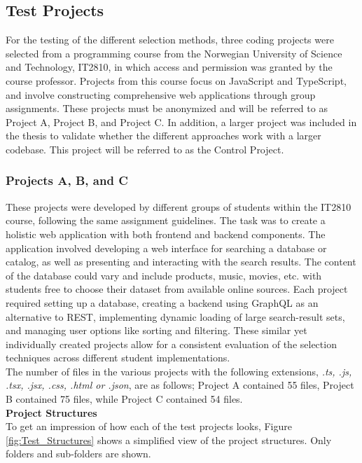 \subsection{Test Projects}
For the testing of the different selection methods, three coding projects were selected from a programming course from the Norwegian University of Science and Technology, IT2810, in which access and permission was granted by the course professor. Projects from this course focus on JavaScript and TypeScript, and involve constructing comprehensive web applications through group assignments. These projects must be anonymized and will be referred to as Project A, Project B, and Project C. In addition, a larger project was included in the thesis to validate whether the different approaches work with a larger codebase. This project will be referred to as the Control Project. \\ 

\subsubsection{Projects A, B, and C} 
These projects were developed by different groups of students within the IT2810 course, following the same assignment guidelines. The task was to create a holistic web application with both frontend and backend components. The application involved developing a web interface for searching a database or catalog, as well as presenting and interacting with the search results. The content of the database could vary and include products, music, movies, etc. with students free to choose their dataset from available online sources. Each project required setting up a database, creating a backend using GraphQL as an alternative to REST, implementing dynamic loading of large search-result sets, and managing user options like sorting and filtering. These similar yet individually created projects allow for a consistent evaluation of the selection techniques across different student implementations. \\

The number of files in the various projects with the following extensions, \textit{.ts, .js, .tsx, .jsx, .css, .html or .json}, are as follows; Project A contained 55 files, Project B contained 75 files, while Project C contained 54 files. \\

\noindent \textbf{Project Structures}\\
\noindent To get an impression of how each of the test projects looks, Figure \ref{fig:Test_Structures} shows a simplified view of the project structures. Only folders and sub-folders are shown. 

